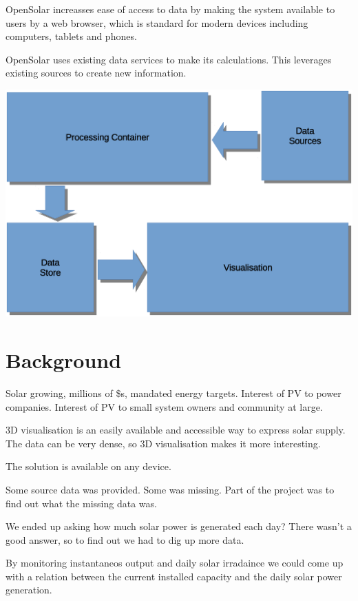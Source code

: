 \documentclass[10pt, a4paper]{article}
\begin{document}
\begin{multicols}{2}
OpenSolar increasses ease of access to data by making the system available to users by a web browser, which is standard for modern devices including computers, tablets and phones.

OpenSolar uses existing data services to make its calculations. This leverages existing sources to create new information.

\includegraphics[scale=0.17]{design1.eps}

\section{Background}

Solar growing, millions of \$s, mandated energy targets.
Interest of PV to power companies.
Interest of PV to small system owners and community at large.

3D visualisation is an easily available and accessible way to express solar supply. The data can be very dense, so 3D visualisation makes it more interesting.

The solution is available on any device.

Some source data was provided. Some was missing. Part of the project was to find out what the missing data was.

We ended up asking how much solar power is generated each day? There wasn't a good answer, so to find out we had to dig up more data.

By monitoring instantaneos output and daily solar irradaince we could come up with a relation between the current installed capacity and the daily solar power generation.


\end{multicols}
\end{document}
